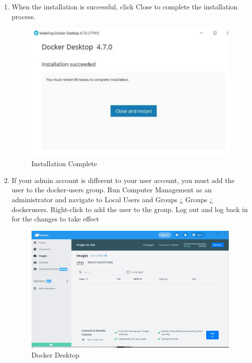 \documentclass[12pt]{article}
\begin{document}
\begin{enumerate}
	\item When the installation is successful, click Close to complete the installation process.
	
\begin{figure}[H]
\centering
\includegraphics[scale=0.7]{fig13}
\caption{Installation Complete}
\vspace{0.6\baselineskip}
\end{figure}	
	
	\item If your admin account is different to your user account, you must add the user to the docker-users group. Run Computer Management as an administrator and navigate to Local Users and Groups ¿ Groups ¿ dockerusers. Right-click to add the user to the group. Log out and log back in for the changes to take effect

	
\begin{figure}[H]
\centering
\includegraphics[scale=0.5]{fig14}
\caption{Docker Desktop}
\vspace{0.6\baselineskip}
\end{figure}	
	
\end{enumerate}
\end{document}
